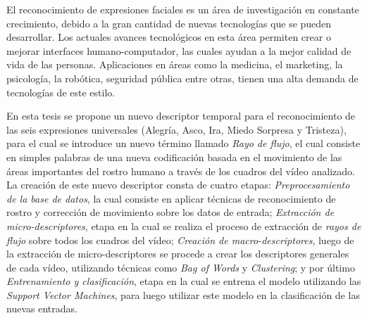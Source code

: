\documentclass[final]{udpthesis}
\begin{document}
\begin{resumen}
El reconocimiento de expresiones faciales es un área de investigación en constante crecimiento, debido a la gran cantidad de nuevas tecnologías que se pueden desarrollar. Los actuales avances tecnológicos en esta área permiten crear o mejorar interfaces humano-computador, las cuales ayudan a la mejor calidad de vida de las personas. Aplicaciones en áreas como la medicina, el marketing, la psicología, la robótica, seguridad pública entre otras, tienen una alta demanda de tecnologías de este estilo.

En esta tesis se propone un nuevo descriptor temporal para el reconocimiento de las seis expresiones universales (Alegría, Asco, Ira, Miedo Sorpresa y Tristeza), para el cual se introduce un nuevo término llamado \textit{Rayo de flujo}, el cual consiste en simples palabras de una nueva codificación  basada en el movimiento de las áreas importantes del rostro humano a través de los cuadros del vídeo analizado. La creación de este nuevo descriptor consta de cuatro etapas:  \emph{Preprocesamiento de la base de datos}, la cual consiste en aplicar técnicas de reconocimiento de rostro y corrección de movimiento sobre los datos de entrada; \emph{Extracción de micro-descriptores}, etapa en la cual se realiza el proceso de extracción de \textit{rayos de flujo} sobre todos los cuadros del vídeo; \emph{Creación de macro-descriptores}, luego de la extracción de micro-descriptores se procede a crear los descriptores generales de cada vídeo, utilizando técnicas como \textit{Bag of Words} y \textit{Clustering}; y por último \emph{Entrenamiento y clasificación}, etapa en la cual se entrena el modelo utilizando  las \emph{Support Vector Machines}, para luego utilizar este modelo en la clasificación de las nuevas entradas.
\end{resumen}



\mainmatter










%
% 
\end{document}
